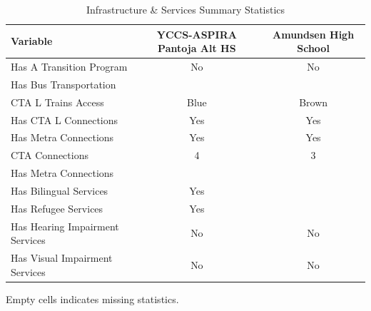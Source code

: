 \begin{table}[H]
\renewcommand{\arraystretch}{1.5}
\caption*{
{\large Infrastructure \& Services Summary Statistics}
} 

\fontsize{10pt}{11pt}\selectfont

\begin{tabular*}{\linewidth}{@{\extracolsep{\fill}}lcc}
\toprule
Variable & YCCS-ASPIRA Pantoja Alt HS & Amundsen High School \\ 
\midrule\addlinespace[2.5pt]
Has A Transition Program & No & No \\
Has Bus Transportation &  &  \\
CTA L Trains Access & Blue & Brown \\
Has CTA L Connections & Yes & Yes \\
Has Metra Connections & Yes & Yes \\
CTA Connections & 4 & 3 \\
Has Metra Connections &  &  \\
Has Bilingual Services & Yes &  \\
Has Refugee Services & Yes &  \\
Has Hearing Impairment Services & No & No \\
Has Visual Impairment Services & No & No \\
\bottomrule
\end{tabular*}
\begin{minipage}{\linewidth}
Empty cells indicates missing statistics.\\
\end{minipage}
\end{table}
